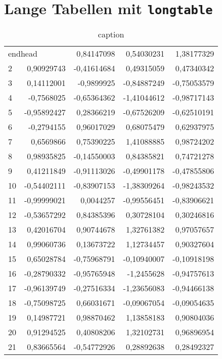 \section{Lange Tabellen mit \texttt{longtable}}\label{sec:longtable}

\begin{longtable}{lrrrr}
\caption{caption} \\
\multicolumn{2}{l}{endhead}\endhead
\multicolumn{5}{c}{endfoot} \endfoot
\multicolumn{2}{l}{endfirsthead} \endfirsthead
\multicolumn{5}{c}{endlastfoot}\endlastfoot
  1 & 0,84147098 & 0,54030231 & 1,38177329 & 0,98218827 \\
  2 & 0,90929743 & -0,41614684 & 0,49315059 & 0,47340342 \\
  3 & 0,14112001 & -0,9899925 & -0,84887249 & -0,75053579 \\
  4 & -0,7568025 & -0,65364362 & -1,41044612 & -0,98717143 \\
  5 & -0,95892427 & 0,28366219 & -0,67526209 & -0,62510191 \\
  6 & -0,2794155 & 0,96017029 & 0,68075479 & 0,62937975 \\
  7 &  0,6569866 & 0,75390225 & 1,41088885 & 0,98724202 \\
  8 & 0,98935825 & -0,14550003 & 0,84385821 & 0,74721278 \\
  9 & 0,41211849 & -0,91113026 & -0,49901178 & -0,47855806 \\
 10 & -0,54402111 & -0,83907153 & -1,38309264 & -0,98243532 \\
 11 & -0,99999021 &  0,0044257 & -0,99556451 & -0,83906621 \\
 12 & -0,53657292 & 0,84385396 & 0,30728104 & 0,30246816 \\
 13 & 0,42016704 & 0,90744678 & 1,32761382 & 0,97057657 \\
 14 & 0,99060736 & 0,13673722 & 1,12734457 & 0,90327604 \\
 15 & 0,65028784 & -0,75968791 & -0,10940007 & -0,10918198 \\
 16 & -0,28790332 & -0,95765948 & -1,2455628 & -0,94757613 \\
 17 & -0,96139749 & -0,27516334 & -1,23656083 & -0,94466138 \\
 18 & -0,75098725 & 0,66031671 & -0,09067054 & -0,09054635 \\
 19 & 0,14987721 & 0,98870462 & 1,13858183 & 0,90804036 \\
 20 & 0,91294525 & 0,40808206 & 1,32102731 & 0,96896954 \\
 21 & 0,83665564 & -0,54772926 & 0,28892638 & 0,28492327 \\

\end{longtable}
